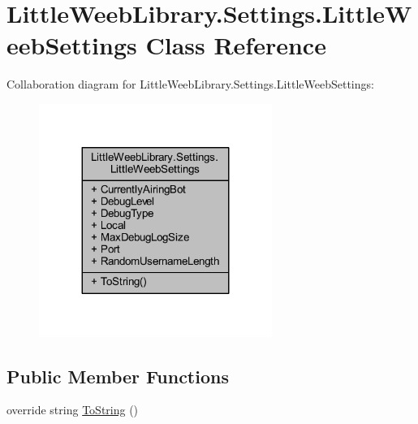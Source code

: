 \hypertarget{class_little_weeb_library_1_1_settings_1_1_little_weeb_settings}{}\section{Little\+Weeb\+Library.\+Settings.\+Little\+Weeb\+Settings Class Reference}
\label{class_little_weeb_library_1_1_settings_1_1_little_weeb_settings}


Collaboration diagram for Little\+Weeb\+Library.\+Settings.\+Little\+Weeb\+Settings\+:\nopagebreak
\begin{figure}[H]
\begin{center}
\leavevmode
\includegraphics[width=215pt]{class_little_weeb_library_1_1_settings_1_1_little_weeb_settings__coll__graph}
\end{center}
\end{figure}
\subsection*{Public Member Functions}
\begin{DoxyCompactItemize}
\item 
override string \mbox{\hyperlink{class_little_weeb_library_1_1_settings_1_1_little_weeb_settings_a5a5b722dd8e117be810022882795b6ae}{To\+String}} ()
\end{DoxyCompactItemize}
